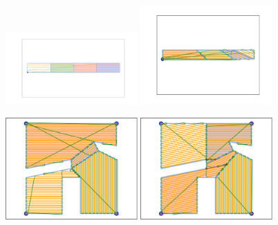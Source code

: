 \documentclass[../main.tex]{subfiles}
\begin{document}



\begin{figure}
		\centering
		\includegraphics[width=0.45\textwidth]{img/chapter_5/ID_1_orig.pdf}%
		\includegraphics[width=0.45\textwidth]{img/chapter_5/ID_1_reopt.pdf}

		\includegraphics[width=0.45\textwidth]{img/chapter_5/ID_2_orig.pdf}%
		\includegraphics[width=0.45\textwidth]{img/chapter_5/ID_2_reopt.pdf}


\end{figure}
\end{document}
